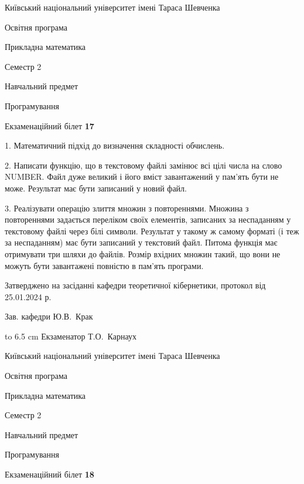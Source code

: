 \documentclass[12pt, ukrainian]{article}
\begin{document}
\vspace{0.9cm}
{{\begin {scriptsize}\par
{ \center  Київський національний університет імені Тараса Шевченка \par}
{\parbox {5 cm}{Освітня програма \hfill}{\parbox {7 cm}{Прикладна математика\hfill}}\parbox {6 cm}{\hfill Семестр 2}}\par
{\parbox {5 cm} {Навчальний предмет \hfill}\parbox {7 cm}{Програмування \hfill}\parbox {6cm}{\hfill}\par}\vspace{-15pt} \end{scriptsize}}{\center Екзаменаційний білет \No \textbf { 17 }\par}}
{%
1. Математичний підхід до визначення складності обчислень.%
\par
2. Написати функцію, що в текстовому файлі замінює всі цілі числа на слово NUMBER. Файл дуже великий і його вміст завантажений у пам'ять бути не може. Результат має бути записаний у новий файл.

\par
3. Реалізувати операцію злиття множин з повтореннями. Множина з повтореннями задається переліком своїх елементів, записаних за неспаданням у текстовому файлі через білі символи. Результат у такому ж самому форматі (і теж за неспаданням) має бути записаний у текстовий файл. Питома функція має отримувати три шляхи до файлів. Розмір вхідних множин такий, що вони не можуть бути завантажені повністю в пам’ять програми.

}
{\smallskip\smallskip \begin {scriptsize} Затверджено на засіданні кафедри теоретичної кібернетики, протокол   від   25.01.2024 р.\par\smallskip\smallskip\smallskip\smallskip
{\parbox {6.5 cm} {Зав. кафедри \dotfill Ю.В.~Крак}}\hspace {0.7cm} {\hbox to 6.5 cm { Екзаменатор \dotfill Т.О.~Карнаух}} \end{scriptsize}}
\vspace{0.9cm}
{{\begin {scriptsize}\par
{ \center  Київський національний університет імені Тараса Шевченка \par}
{\parbox {5 cm}{Освітня програма \hfill}{\parbox {7 cm}{Прикладна математика\hfill}}\parbox {6 cm}{\hfill Семестр 2}}\par
{\parbox {5 cm} {Навчальний предмет \hfill}\parbox {7 cm}{Програмування \hfill}\parbox {6cm}{\hfill}\par}\vspace{-15pt} \end{scriptsize}}{\center Екзаменаційний білет \No \textbf { 18 }\par}}
\end{document}

